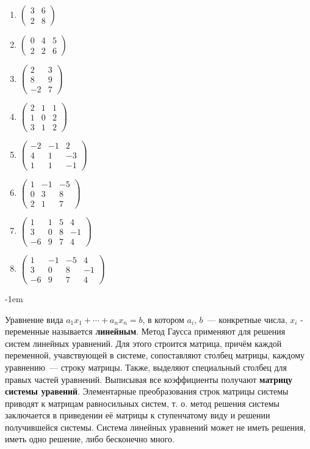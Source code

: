 \documentclass[a4paper,10pt]{article}
\begin{document}
\begin{multicols}{4}
	\begin{enumerate}[label=(\arabic*)\,]
		\item 
$\begin{pmatrix}
    3 & 6 \\
    2 & 8
\end{pmatrix}$
		\item 
$\begin{pmatrix}
    0 & 4 & 5 \\
    2 & 2 & 6
\end{pmatrix}$
		\item 
$\begin{pmatrix}
    2 & 3 \\
    8 & 9 \\
   -2 & 7
\end{pmatrix}$
		\item 
$\begin{pmatrix}
    2 & 1 & 1 \\
    1 & 0 & 2 \\
    3 & 1 & 2
\end{pmatrix}$
		\item 
$\begin{pmatrix}
    -2 & -1 & 2 \\
    4 & 1 & -3 \\
    1 & 1 & -1
\end{pmatrix}$
		\item 
$\begin{pmatrix}
    1 & -1 & -5 \\
    0 & 3 & 8 \\
    2 & 1 & 7
\end{pmatrix}$
		\item 
$\begin{pmatrix}
    1 & 1 & 5 & 4 \\
    3 & 0 & 8 & -1 \\
    -6 & 9 & 7 & 4
\end{pmatrix}$
		\item 
$\begin{pmatrix}
    1 & -1 & -5 & 4 \\
    3 & 0 & 8 & -1 \\
    -6 & 9 & 7 & 4
\end{pmatrix}$
	\end{enumerate}
\end{multicols}\par\kern-1em

Уравнение вида $a_1x_1+\cdots+a_nx_n=b$, в котором $a_i$, $b$~--- конкретные числа, $x_i$ - переменные называется \textbf{линейным}. Метод Гаусса применяют для решения систем линейных уравнений. Для этого строится матрица, причём каждой переменной, учавствующей в системе, сопоставляют столбец матрицы, каждому уравнению~--- строку матрицы. Также, выделяют специальный столбец для правых частей уравнений. Выписывая все коэффициенты получают \textbf{матрицу системы уравений}. Элементарные преобразования строк матрицы системы приводят к матрицам равносильных систем, т. о. метод решения системы заключается в приведении её матрицы к ступенчатому виду и решении получившейся системы. Система линейных уравнений может не иметь решения, иметь одно решение, либо бесконечно много.
\end{document}
